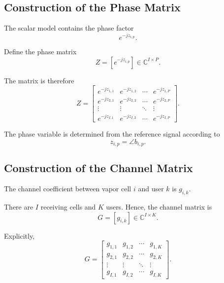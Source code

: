 \documentclass[12pt,a4paper]{article}
\begin{document}
\subsection{Construction of the Phase Matrix}

The scalar model contains the phase factor
\begin{equation}
e^{-jz_{i,p}}.
\tag{135}
\end{equation}

Define the phase matrix
\begin{equation}
\boxed{
Z=
[e^{-jz_{i,p}}]
\in
\mathbb{C}^{I\times P}
}.
\tag{136}
\end{equation}

The matrix is therefore
\begin{equation}
Z=
\begin{bmatrix}
e^{-jz_{1,1}} & e^{-jz_{1,2}} & \cdots & e^{-jz_{1,P}}\\
e^{-jz_{2,1}} & e^{-jz_{2,2}} & \cdots & e^{-jz_{2,P}}\\
\vdots & \vdots & \ddots & \vdots\\
e^{-jz_{I,1}} & e^{-jz_{I,2}} & \cdots & e^{-jz_{I,P}}
\end{bmatrix}.
\tag{137}
\end{equation}

The phase variable is determined from the reference signal according
to
\begin{equation}
z_{i,p}
=
\angle b_{i,p}.
\tag{138}
\end{equation}

\subsection{Construction of the Channel Matrix}

The channel coefficient between vapor cell $i$ and user $k$ is
$g_{i,k}$.

There are $I$ receiving cells and $K$ users. Hence, the channel
matrix is
\begin{equation}
\boxed{
G=[g_{i,k}]
\in
\mathbb{C}^{I\times K}
}.
\tag{139}
\end{equation}

Explicitly,
\begin{equation}
G=
\begin{bmatrix}
g_{1,1} & g_{1,2} & \cdots & g_{1,K}\\
g_{2,1} & g_{2,2} & \cdots & g_{2,K}\\
\vdots & \vdots & \ddots & \vdots\\
g_{I,1} & g_{I,2} & \cdots & g_{I,K}
\end{bmatrix}.
\tag{140}
\end{equation}
\end{document}
